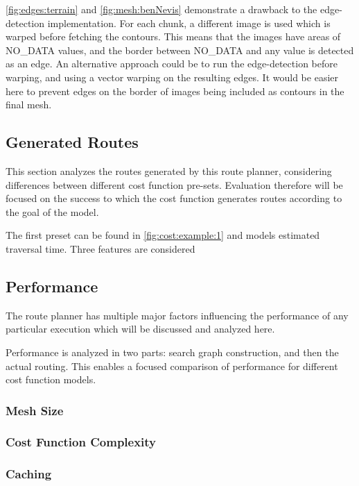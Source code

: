 \documentclass[12pt]{article}
\begin{document}
\autoref{fig:edges:terrain} and \autoref{fig:mesh:benNevis} demonstrate a drawback to the edge-detection implementation. For each chunk, a different image is used which is warped before fetching the contours. This means that the images have areas of NO\_DATA values, and the border between NO\_DATA and any value is detected as an edge. An alternative approach could be to run the edge-detection before warping, and using a vector warping on the resulting edges. It would be easier here to prevent edges on the border of images being included as contours in the final mesh.

\subsection{Generated Routes}

This section analyzes the routes generated by this route planner, considering differences between different cost function pre-sets. Evaluation therefore will be focused on the success to which the cost function generates routes according to the goal of the model.

The first preset can be found in \autoref{fig:cost:example:1} and models estimated traversal time. Three features are considered

\subsection{Performance}

The route planner has multiple major factors influencing the performance of any particular execution which will be discussed and analyzed here.

Performance is analyzed in two parts: search graph construction, and then the actual routing. This enables a focused comparison of performance for different cost function models.

\subsubsection{Mesh Size}

\subsubsection{Cost Function Complexity}

\subsubsection{Caching}
\end{document}
